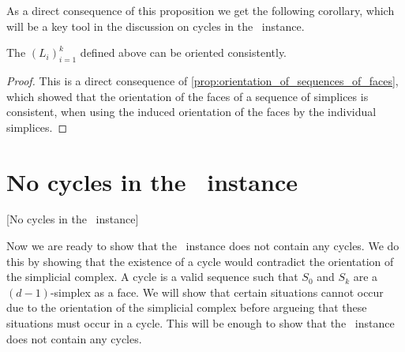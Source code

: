 As a direct consequence of this proposition we get the following corollary, which will be a key tool in the discussion on cycles in the \EndOfLine\ instance.

\begin{corollary}
	The $\left(L_i\right)_{i=1}^{k}$ defined above can be oriented consistently.
\end{corollary}
\begin{proof}
	This is a direct consequence of \cref{prop:orientation_of_sequences_of_faces}, which showed that the orientation of the faces of a sequence of simplices is consistent, when using the induced orientation of the faces by the individual simplices.
\end{proof}

\section{No cycles in the \EndOfLine\ instance}[No cycles in the \EndOfLine\ instance]

Now we are ready to show that the \EndOfLine\ instance does not contain any cycles. We do this by showing that the existence of a cycle would contradict the orientation of the simplicial complex. A cycle is a valid sequence such that $S_0$ and $S_k$ are a $(d-1)$-simplex as a face. We will show that certain situations cannot occur due to the orientation of the simplicial complex before argueing that these situations must occur in a cycle. This will be enough to show that the \EndOfLine\ instance does not contain any cycles.

